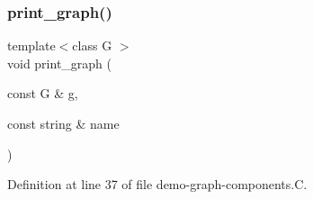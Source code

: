 \subsubsection{\texorpdfstring{print\+\_\+graph()}{print\_graph()}}
{\footnotesize\ttfamily template$<$class G $>$ \\
void print\+\_\+graph (\begin{DoxyParamCaption}\item[{const G \&}]{g,  }\item[{const string \&}]{name }\end{DoxyParamCaption})}



Definition at line 37 of file demo-\/graph-\/components.\+C.

